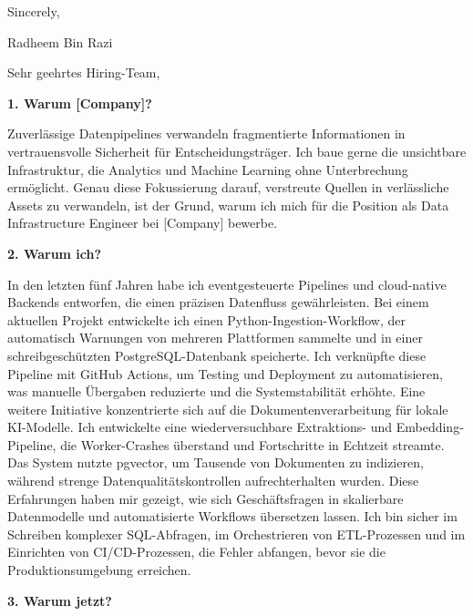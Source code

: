 \documentclass[11pt,a4paper]{coverletter}
\begin{document}
\closing{Sincerely,}{Radheem Bin Razi}

\clearpage
{}


\opening{Sehr geehrtes Hiring-Team,}

\vspace{8pt}\noindent\textbf{1. Warum [Company]?}\par\vspace{3pt}

Zuverlässige Datenpipelines verwandeln fragmentierte Informationen in vertrauensvolle Sicherheit für Entscheidungsträger. Ich baue gerne die unsichtbare Infrastruktur, die Analytics und Machine Learning ohne Unterbrechung ermöglicht. Genau diese Fokussierung darauf, verstreute Quellen in verlässliche Assets zu verwandeln, ist der Grund, warum ich mich für die Position als Data Infrastructure Engineer bei [Company] bewerbe.

\vspace{8pt}\noindent\textbf{2. Warum ich?}\par\vspace{3pt}

In den letzten fünf Jahren habe ich eventgesteuerte Pipelines und cloud-native Backends entworfen, die einen präzisen Datenfluss gewährleisten. Bei einem aktuellen Projekt entwickelte ich einen Python-Ingestion-Workflow, der automatisch Warnungen von mehreren Plattformen sammelte und in einer schreibgeschützten PostgreSQL-Datenbank speicherte. Ich verknüpfte diese Pipeline mit GitHub Actions, um Testing und Deployment zu automatisieren, was manuelle Übergaben reduzierte und die Systemstabilität erhöhte. Eine weitere Initiative konzentrierte sich auf die Dokumentenverarbeitung für lokale KI-Modelle. Ich entwickelte eine wiederversuchbare Extraktions- und Embedding-Pipeline, die Worker-Crashes überstand und Fortschritte in Echtzeit streamte. Das System nutzte pgvector, um Tausende von Dokumenten zu indizieren, während strenge Datenqualitätskontrollen aufrechterhalten wurden. Diese Erfahrungen haben mir gezeigt, wie sich Geschäftsfragen in skalierbare Datenmodelle und automatisierte Workflows übersetzen lassen. Ich bin sicher im Schreiben komplexer SQL-Abfragen, im Orchestrieren von ETL-Prozessen und im Einrichten von CI/CD-Prozessen, die Fehler abfangen, bevor sie die Produktionsumgebung erreichen.

\vspace{8pt}\noindent\textbf{3. Warum jetzt?}\par\vspace{3pt}
\end{document}
